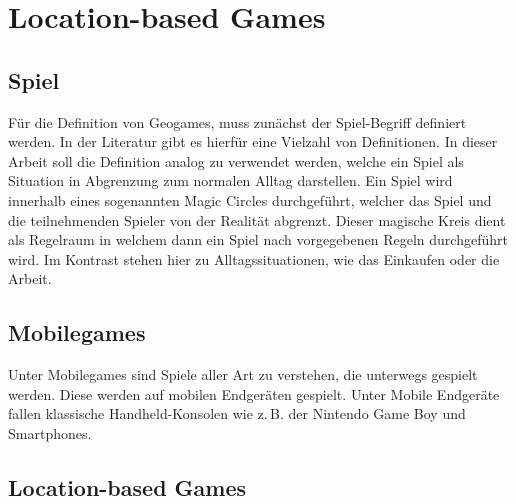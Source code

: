 \section{Location-based Games}
\label{ch3:s:Geogames}

\subsection*{Spiel}

Für die Definition von Geogames, muss zunächst der Spiel-Begriff definiert werden. In der Literatur gibt es hierfür eine Vielzahl von Definitionen.
In dieser Arbeit soll die Definition analog zu \textcite{Salen.2010} verwendet werden, welche ein Spiel als Situation in Abgrenzung zum normalen Alltag darstellen. Ein Spiel wird innerhalb eines sogenannten Magic Circles durchgeführt, welcher das Spiel und die teilnehmenden Spieler von der Realität abgrenzt.
Dieser magische Kreis dient als Regelraum in welchem dann ein Spiel nach vorgegebenen Regeln durchgeführt wird. Im Kontrast stehen hier zu Alltagssituationen, wie das Einkaufen oder die Arbeit.


\subsection*{Mobilegames}

Unter Mobilegames sind Spiele aller Art zu verstehen, die unterwegs gespielt werden. Diese werden auf mobilen Endgeräten gespielt.\cite{Bell.2006} Unter Mobile Endgeräte fallen klassische Handheld-Konsolen wie z.\,B. der Nintendo Game Boy und Smartphones.

\subsection*{Location-based Games}

